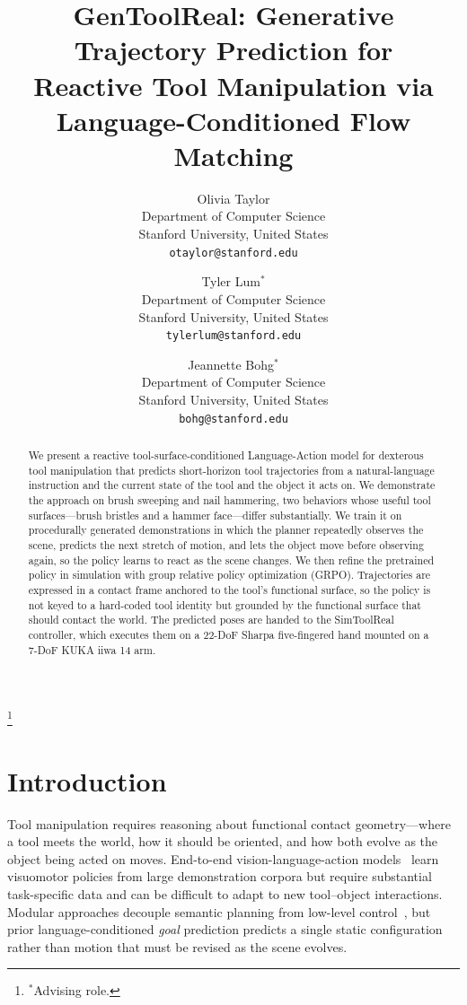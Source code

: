 \documentclass[11pt]{article}
\title{GenToolReal: Generative Trajectory Prediction for\\Reactive Tool Manipulation via\\Language-Conditioned Flow Matching}
\author{
  Olivia Taylor\\
  Department of Computer Science\\
  Stanford University, United States\\
  \texttt{otaylor@stanford.edu}
  \and
  Tyler Lum$^{*}$\\
  Department of Computer Science\\
  Stanford University, United States\\
  \texttt{tylerlum@stanford.edu}
  \and
  Jeannette Bohg$^{*}$\\
  Department of Computer Science\\
  Stanford University, United States\\
  \texttt{bohg@stanford.edu}
}
\date{}
\begin{document}
\maketitle
{\let\thefootnote\relax\footnote{$^{*}$Advising role.}}

\begin{abstract}
We present a reactive tool-surface-conditioned Language-Action model for dexterous tool manipulation that predicts short-horizon tool trajectories from a natural-language instruction and the current state of the tool and the object it acts on.
We demonstrate the approach on brush sweeping and nail hammering, two behaviors whose useful tool surfaces---brush bristles and a hammer face---differ substantially.
We train it on procedurally generated demonstrations in which the planner repeatedly observes the scene, predicts the next stretch of motion, and lets the object move before observing again, so the policy learns to react as the scene changes.
We then refine the pretrained policy in simulation with group relative policy optimization (GRPO).
Trajectories are expressed in a contact frame anchored to the tool's functional surface, so the policy is not keyed to a hard-coded tool identity but grounded by the functional surface that should contact the world.
The predicted poses are handed to the SimToolReal controller, which executes them on a 22-DoF Sharpa five-fingered hand mounted on a 7-DoF KUKA iiwa 14 arm.
\end{abstract}

\section{Introduction}

Tool manipulation requires reasoning about functional contact geometry---where a tool meets the world, how it should be oriented, and how both evolve as the object being acted on moves.
End-to-end vision-language-action models~\cite{pi0,openvla,groot} learn visuomotor policies from large demonstration corpora but require substantial task-specific data and can be difficult to adapt to new tool--object interactions.
Modular approaches decouple semantic planning from low-level control~\cite{saycan,scaffolding,simtoolreal}, but prior language-conditioned \emph{goal} prediction predicts a single static configuration rather than motion that must be revised as the scene evolves.
\end{document}
